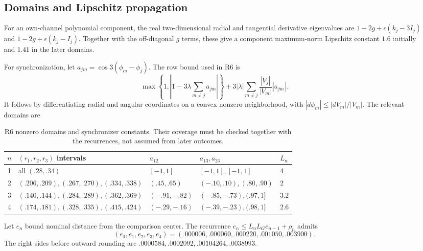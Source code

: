 \documentclass[11pt,a4paper]{article}
\numberwithin{equation}{section}
\begin{document}
\subsection{Domains and Lipschitz propagation}
For an own-channel polynomial component, the real two-dimensional radial
and tangential derivative eigenvalues are
$1-2g+\epsilon(k_j-3I_j)$ and $1-2g+\epsilon(k_j-I_j)$.
Together with the off-diagonal $g$ terms, these give a component maximum-norm
Lipschitz constant $1.6$ initially and $1.41$ in the later domains.

For synchronization, let $a_{jm}=\cos3(\phi_m-\phi_j)$. The row bound
used in R6 is
\begin{equation}\label{eq:synclip}
\max\left\{1,\left|1-3\lambda\sum_{m\ne j}a_{jm}\right|\right\}
+3|\lambda|\sum_{m\ne j}\frac{|V_j|}{|V_m|}|a_{jm}|.
\end{equation}
It follows by differentiating radial and angular coordinates on a convex
nonzero neighborhood, with $|d\phi_m|\leq |dV_m|/|V_m|$.
The relevant domains are
\begin{table}[htbp]
\centering\small
\begin{tabular}{@{}cllll@{}}
\toprule
$n$&$(r_1,r_2,r_3)$ intervals&$a_{12}$&$a_{13},a_{23}$&$L_n$\\ \midrule
1&all $(.28,.34)$&$[-1,1]$&$[-1,1],[-1,1]$&4\\
2&$(.206,.209),(.267,.270),(.334,.338)$&$(.45,.65)$&
$(-.10,.10),(.80,.90)$&2\\
3&$(.140,.144),(.284,.289),(.362,.369)$&$(-.91,-.82)$&
$(-.85,-.73),(.97,1]$&3.2\\
4&$(.174,.181),(.328,.335),(.415,.424)$&$(-.29,-.16)$&
$(-.39,-.23),(.98,1]$&2.6\\
\bottomrule
\end{tabular}
\caption{R6 nonzero domains and synchronizer constants. Their coverage must
be checked together with the recurrences, not assumed from later outcomes.}
\label{tab:lipdomains}
\end{table}

Let $e_n$ bound nominal distance from the comparison center.
The recurrence $e_n\leq L_nL_Ge_{n-1}+\rho_n$ admits
\[
(e_0,e_1,e_2,e_3,e_4)
=(.000006,.000060,.000220,.001050,.003900).
\]
The right sides before outward rounding are
$.0000584,.0002092,.00104264,.0038993$.
\end{document}
